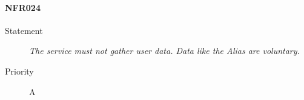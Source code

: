 \paragraph{NFR024}
\begin{description}
  \item [Statement] \textit{The service must not gather user data. Data like the \gls{Alias} are voluntary.}
  \item [Priority] A
\end{description}
